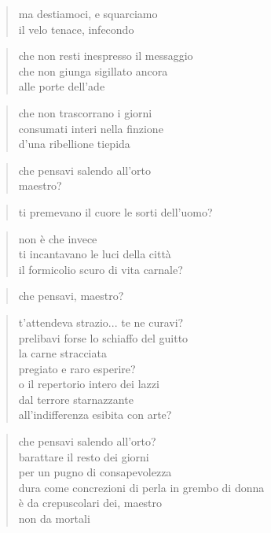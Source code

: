 \begin{verse}
    ma destiamoci, e squarciamo\\
    il velo tenace, infecondo
\end{verse}

\begin{verse}
    che non resti inespresso il messaggio\\
    che non giunga sigillato ancora\\
    alle porte dell'ade
\end{verse}

\begin{verse}
    che non trascorrano i giorni\\
    consumati interi nella finzione\\
    d'una ribellione tiepida
\end{verse}

\clearpage


\begin{verse}
    che pensavi salendo all'orto\\
    maestro?
\end{verse}

\begin{verse}
    ti premevano il cuore le sorti dell'uomo?
\end{verse}

\begin{verse}
    non è che invece\\
    ti incantavano le luci della città\\
    il formicolio scuro di vita carnale?
\end{verse}

\begin{verse}
    che pensavi, maestro?
\end{verse}

\begin{verse}
    t'attendeva strazio... te ne curavi?\\
    prelibavi forse lo schiaffo del guitto\\
    la carne stracciata\\
    pregiato e raro esperire?\\
    o il repertorio intero dei lazzi\\
    dal terrore starnazzante\\
    all'indifferenza esibita con arte?
\end{verse}

\begin{verse}
    che pensavi salendo all'orto?\\
    barattare il resto dei giorni\\
    per un pugno di consapevolezza\\
    dura come concrezioni di perla in grembo di donna\\
    è da crepuscolari dei, maestro\\
    non da mortali
\end{verse}

